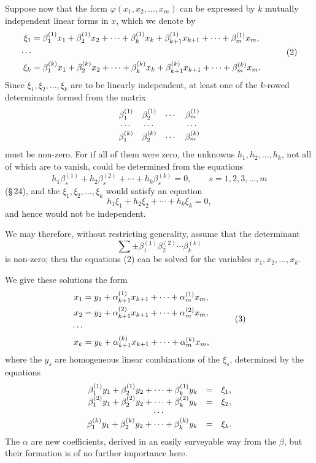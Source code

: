 \documentclass[11pt]{article}
\begin{document}
Suppose now that the form $\varphi(x_1,x_2,\ldots,x_m)$ can be expressed by $k$ mutually independent linear forms in $x$, which we denote by
\begin{equation}
\begin{aligned}
 \xi_1&=\beta^{(1)}_1x_1+\beta^{(1)}_2x_2+\cdots+\beta^{(1)}_kx_k+\beta^{(1)}_{k+1}x_{k+1}+\cdots+\beta^{(1)}_mx_m,\cr
 \cdots&\cr
 \xi_k&=\beta^{(k)}_1x_1+\beta^{(k)}_2x_2+\cdots+\beta^{(k)}_kx_k+\beta^{(k)}_{k+1}x_{k+1}+\cdots+\beta^{(k)}_mx_m.
\end{aligned}
\tag{2}
\end{equation}
Since $\xi_1,\xi_2,\ldots,\xi_k$ are to be linearly independent, at least one of the $k$-rowed determinants formed from the matrix
\[
\begin{array}{cccc}
 \beta^{(1)}_1&\beta^{(1)}_2&\cdots&\beta^{(1)}_m\cr
 \cdots&\cdots&&\cdots\cr
 \beta^{(k)}_1&\beta^{(k)}_2&\cdots&\beta^{(k)}_m
\end{array}
\]
must be non-zero. For if all of them were zero, the unknowns $h_1,h_2,\ldots,h_k$, not all of which are to vanish, could be determined from the equations
\[
        h_1\beta^{(1)}_s+h_2\beta^{(2)}_s+\cdots+h_k\beta^{(k)}_s=0,
        \qquad s=1,2,3,\ldots,m
\]
(\S\,24), and the $\xi_1,\xi_2,\ldots,\xi_k$ would satisfy an equation
\[
        h_1\xi_1+h_2\xi_2+\cdots+h_k\xi_k=0,
\]
and hence would not be independent.

We may therefore, without restricting generality, assume that the determinant
\[
        \sum\pm \beta^{(1)}_1\beta^{(2)}_2\cdots\beta^{(k)}_k
\]
is non-zero; then the equations (2) can be solved for the variables $x_1,x_2,\ldots,x_k$.

We give these solutions the form
\begin{equation}
\begin{aligned}
 x_1&=y_1+\alpha^{(1)}_{k+1}x_{k+1}+\cdots+\alpha^{(1)}_mx_m,\cr
 x_2&=y_2+\alpha^{(2)}_{k+1}x_{k+1}+\cdots+\alpha^{(2)}_mx_m,\cr
 \cdots&\cr
 x_k&=y_k+\alpha^{(k)}_{k+1}x_{k+1}+\cdots+\alpha^{(k)}_mx_m,
\end{aligned}
\tag{3}
\end{equation}
where the $y_s$ are homogeneous linear combinations of the $\xi_s$, determined by the equations
\[
\begin{array}{rcl}
 \beta^{(1)}_1y_1+\beta^{(1)}_2y_2+\cdots+\beta^{(1)}_ky_k&=&\xi_1,\cr
 \beta^{(2)}_1y_1+\beta^{(2)}_2y_2+\cdots+\beta^{(2)}_ky_k&=&\xi_2,\cr
 \multicolumn{3}{c}{\cdots}\cr
 \beta^{(k)}_1y_1+\beta^{(k)}_2y_2+\cdots+\beta^{(k)}_ky_k&=&\xi_k.
\end{array}
\]
The $\alpha$ are new coefficients, derived in an easily surveyable way from the $\beta$, but their formation is of no further importance here.
\end{document}
